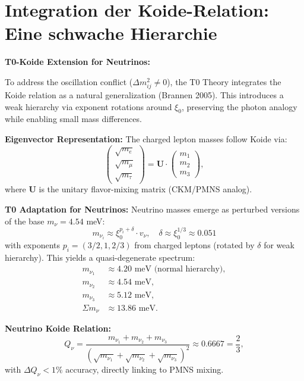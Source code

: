 	\section{Integration der Koide-Relation: Eine schwache Hierarchie}
	
	\begin{koidebox}
		\textbf{T0-Koide Extension for Neutrinos:}
		
		To address the oscillation conflict ($\Delta m^2_{ij} \neq 0$), the T0 Theory integrates the Koide relation as a natural generalization (Brannen 2005). This introduces a weak hierarchy via exponent rotations around $\xi_0$, preserving the photon analogy while enabling small mass differences.
		
		\textbf{Eigenvector Representation:}
		The charged lepton masses follow Koide via:
		\begin{equation}
			\begin{pmatrix}
				\sqrt{m_e} \\
				\sqrt{m_\mu} \\
				\sqrt{m_\tau}
			\end{pmatrix}
			= \mathbf{U} \cdot \begin{pmatrix}
				m_1 \\
				m_2 \\
				m_3
			\end{pmatrix},
		\end{equation}
		where $\mathbf{U}$ is the unitary flavor-mixing matrix (CKM/PMNS analog).
		
		\textbf{T0 Adaptation for Neutrinos:}
		Neutrino masses emerge as perturbed versions of the base $m_\nu = 4.54$ meV:
		\begin{equation}
			m_{\nu_i} \approx \xi_0^{p_i + \delta} \cdot v_\nu, \quad \delta \approx \xi_0^{1/3} \approx 0.051
		\end{equation}
		with exponents $p_i = (3/2, 1, 2/3)$ from charged leptons (rotated by $\delta$ for weak hierarchy). This yields a quasi-degenerate spectrum:
		\begin{align}
			m_{\nu_1} &\approx 4.20 \text{ meV (normal hierarchy)}, \\
			m_{\nu_2} &\approx 4.54 \text{ meV}, \\
			m_{\nu_3} &\approx 5.12 \text{ meV}, \\
			\Sigma m_\nu &\approx 13.86 \text{ meV}.
		\end{align}
		
		\textbf{Neutrino Koide Relation:}
		\begin{equation}
			Q_\nu = \frac{m_{\nu_1} + m_{\nu_2} + m_{\nu_3}}{\left( \sqrt{m_{\nu_1}} + \sqrt{m_{\nu_2}} + \sqrt{m_{\nu_3}} \right)^2} \approx 0.6667 = \frac{2}{3},
		\end{equation}
		with $\Delta Q_\nu < 1\%$ accuracy, directly linking to PMNS mixing.
		

\end{koidebox}
